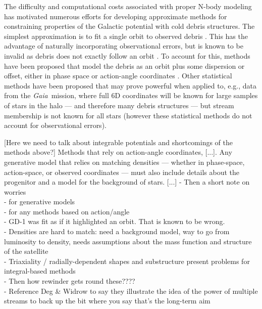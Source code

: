 \documentclass[letterpaper,12pt,preprint]{aastex}
\newcommand{\project}[1]{\textsl{#1}}
\newcommand{\gaia}{\project{Gaia}~}
\begin{document}
The difficulty and computational costs associated with proper N-body modeling has motivated numerous efforts for developing approximate methods for constraining properties of the Galactic potential with cold debris structures. The simplest approximation is to fit a single orbit to observed debris \citep[e.g.,][]{koposov10, deg13}. This has the advantage of naturally incorporating observational errors, but is known to be invalid as debris does not exactly follow an orbit \citep[e.g.,][]{eyre11, sanders13a}. To account for this, methods have been proposed that model the debris as an orbit plus some dispersion or offset, either in phase space \citep[e.g.,][]{eyre09a, varghese11, kuepper12} or action-angle coordinates \citep{eyre11, sanders13b, bovy14, sanders14}. Other statistical methods have been proposed \citep[][]{penarrubia12, sanderson14} that may prove powerful when applied to, e.g., data from the \gaia mission, where full 6D coordinates will be known for large samples of stars in the halo --- and therefore many debris structures --- but stream membership is not known for all stars (however these statistical methods do not account for observational errors).

[Here we need to talk about integrable potentials and shortcomings of the methods above?] Methods that rely on action-angle coordinates, [...]. Any generative model that relies on matching densities --- whether in phase-space, action-space, or observed coordinates --- must also include details about the progenitor and a model for the background of stars. [...] 
- Then a short note on worries\\
\indent\indent- for generative models\\
\indent\indent- for any methods based on action/angle \\
\indent\indent- GD-1 was fit as if it highlighted an orbit.  That is known to be wrong.\\
\indent\indent- Densities are hard to match: need a background model, way to go from luminosity to density, needs assumptions about the mass function and structure of the satellite\\
\indent\indent- Triaxiality / radially-dependent shapes and substructure present problems for integral-based methods\\
- Then how rewinder gets round these????\\
\indent\indent- Reference Deg \& Widrow to say they illustrate the idea of the power of multiple streams to back up the bit where you say that's the long-term aim
\end{document}
